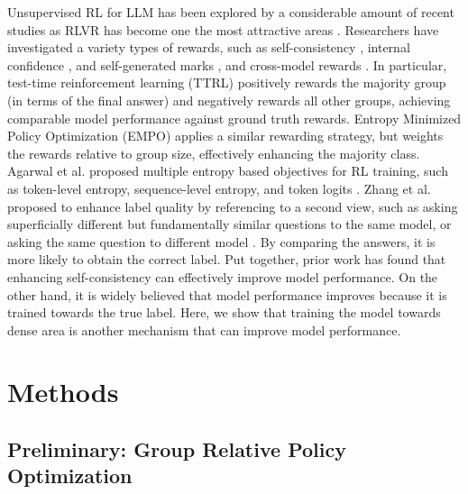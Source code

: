 \documentclass{article}
\begin{document}
Unsupervised RL for LLM has been explored by a considerable amount of recent studies as RLVR has become one the most attractive areas \cite{zuottrl,zhangright,zhangconsistent,agarwalunreasonable}. Researchers have investigated a variety types of rewards, such as self-consistency \cite{zuottrl,zhangright}, internal confidence \cite{agarwalunreasonable}, and self-generated marks \cite{yuan2024self,wu2025meta}, and cross-model rewards \cite{zhang2025co}. In particular, test-time reinforcement learning (TTRL) positively rewards the majority group (in terms of the final answer) and negatively rewards all other groups, achieving comparable model performance against ground truth rewards. Entropy Minimized Policy Optimization (EMPO) applies a similar rewarding strategy, but weights the rewards relative to group size, effectively enhancing the majority class. Agarwal et al. proposed multiple entropy based objectives for RL training, such as token-level entropy, sequence-level entropy, and token logits \cite{agarwalunreasonable}. Zhang et al. proposed to enhance label quality by referencing to a second view, such as asking superficially different but fundamentally similar questions to the same model, or asking the same question to different model \cite{zhang2025co}. By comparing the answers, it is more likely to obtain the correct label. Put together, prior work has found that enhancing self-consistency can effectively improve model performance. On the other hand, it is widely believed that model performance improves because it is trained towards the true label. Here, we show that training the model towards dense area is another mechanism that can improve model performance. 



\section{Methods}

\subsection{Preliminary: Group Relative Policy Optimization}
\end{document}
